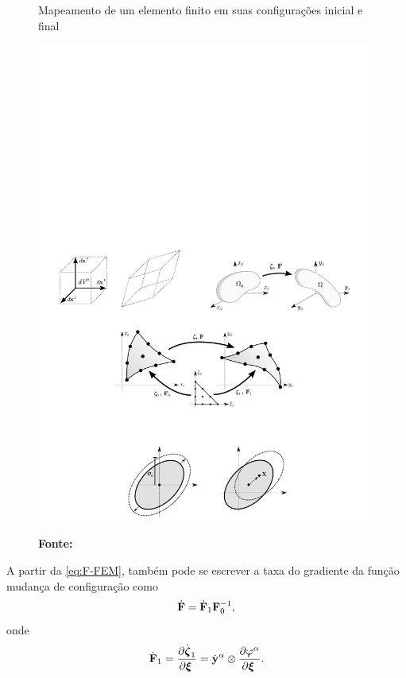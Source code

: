 \documentclass[Tese.tex]{subfiles}
\begin{document}
\begin{figure}[h]
	\centering
	\caption{Mapeamento de um elemento finito em suas configurações inicial e final}
	\label{fig:mefp}
	{\includegraphics[scale=1.1]{Figuras/mefp.pdf}}	
	\caption*{\textbf{Fonte:} }
\end{figure}

A partir da \cref{eq:F-FEM}, também pode se escrever a taxa do gradiente da função mudança de configuração como
\begin{equation}\label{eq:dotF-FEM}
\dot{\mathbf{F}} = \dot{\mathbf{F}}_1\mathbf{F}_0^{-1},
\end{equation}
onde
\begin{equation}
\dot{\mathbf{F}}_1 = \dfrac{\partial\dot{\boldsymbol{\zeta}}_1}{\partial\boldsymbol{\xi}_{\;}} = \dot{\mathbf{y}}^\alpha\otimes\dfrac{\partial\varphi^\alpha}{\partial\boldsymbol{\xi}_{\;}}. \label{eq:dotF1}
\end{equation}
\end{document}
